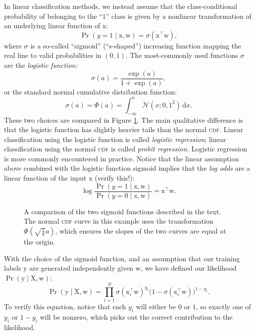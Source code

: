 \documentclass{article}
\newcommand{\acro}[1]{\textsc{\MakeLowercase{#1}}}
\newcommand{\given}{\mid}
\newcommand{\mc}[1]{\mathcal{#1}}
\newcommand{\intd}[1]{\,\mathrm{d}{#1}}
\newcommand{\trans}{^\top}
\newcommand{\mat}[1]{\bm{\mathrm{#1}}}
\renewcommand{\vec}[1]{\bm{\mathrm{#1}}}
\begin{document}
In linear classification methods, we instead assume that the
class-conditional probability of belonging to the ``$1$'' class is
given by a nonlinear transformation of an underlying linear function
of $\vec{x}$:
\begin{equation*}
  \Pr(y = 1 \given \vec{x}, \vec{w})
  =
  \sigma(\vec{x}\trans \vec{w}),
\end{equation*}
where $\sigma$ is a so-called ``sigmoid'' (``s-shaped'') increasing
function mapping the real line to valid probabilities in $(0, 1)$.
The most-commonly used functions $\sigma$ are the \emph{logistic function:}
\begin{equation*}
  \sigma(a) = \frac{\exp(a)}{1 + \exp(a)},
\end{equation*}
or the standard normal cumulative distribution function:
\begin{equation*}
  \sigma(a) = \Phi(a) = \int_{-\infty}^a \mc{N}(x; 0, 1^2) \intd x.
\end{equation*}
These two choices are compared in Figure \ref{sigmoids}.  The main
qualitative difference is that the logistic function has slightly
heavier tails than the normal \acro{CDF}.  Linear classification using
the logistic function is called \emph{logistic regression}; linear
classification using the normal \acro{CDF} is called \emph{probit
  regression.}  Logistic regression is more commonly encountered in
practice.  Notice that the linear assumption above combined with the
logistic function sigmoid implies that the \emph{log odds} are a
linear function of the input $\vec{x}$ (verify this!):
\begin{equation*}
  \log
  \frac{\Pr(y = 1 \given \vec{x}, \vec{w})}
       {\Pr(y = 0 \given \vec{x}, \vec{w})}
  =
  \vec{x}\trans \vec{w}.
\end{equation*}

\begin{figure}
  \centering
  
  \caption{A comparison of the two sigmoid functions described in the
    text.  The normal \acro{CDF} curve in this example uses the
    transformation $\Phi(\sqrt{\frac{\pi}{8}} a)$, which ensures the
    slopes of the two curves are equal at the origin.}
  \label{sigmoids}
\end{figure}

With the choice of the sigmoid function, and an assumption that our
training labels $\vec{y}$ are generated independently given $\vec{w}$,
we have defined our likelihood $\Pr(\vec{y} \given \mat{X}, \vec{w})$:
\begin{equation}
  \label{likelihood}
  \Pr(\vec{y} \given \mat{X}, \vec{w})
  =
  \prod_{i = 1}^N
  \sigma(\vec{x}_i\trans \vec{w})^{y_i}
  \bigl(1 - \sigma(\vec{x}_i\trans \vec{w})\bigr)^{1 - y_i}.
\end{equation}
To verify this equation, notice that each $y_i$ will either be $0$ or
$1$, so exactly one of $y_i$ or $1 - y_i$ will be nonzero, which
picks out the correct contribution to the likelihood.
\end{document}
